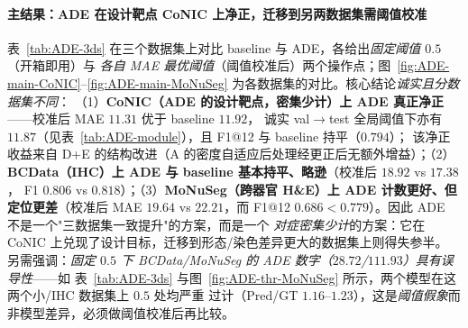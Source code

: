 \paragraph{主结果：ADE 在设计靶点 CoNIC 上净正，迁移到另两数据集需阈值校准}
表~\ref{tab:ADE-3ds} 在三个数据集上对比 baseline 与 ADE，各给出\emph{固定阈值 $0.5$}（开箱即用）与
\emph{各自 MAE 最优阈值}（阈值校准后）两个操作点；图~\ref{fig:ADE-main-CoNIC}--\ref{fig:ADE-main-MoNuSeg}
为各数据集的对比。核心结论\emph{诚实且分数据集不同}：
（1）\textbf{CoNIC（ADE 的设计靶点，密集少计）上 ADE 真正净正}——校准后 MAE $11.31$ 优于 baseline $11.92$，
诚实 val$\to$test 全局阈值下亦有 \textbf{$11.87$}（见表~\ref{tab:ADE-module}），且 F1@12 与 baseline 持平（$0.794$）；
该净正收益来自 D+E 的结构改进（A 的密度自适应后处理经更正后无额外增益）；（2）\textbf{BCData（IHC）上 ADE 与 baseline 基本持平、略逊}（校准后 $18.92$ vs $17.38$，
F1 $0.806$ vs $0.818$）；（3）\textbf{MoNuSeg（跨器官 H\&E）上 ADE 计数更好、但定位更差}（校准后 MAE
$19.64$ vs $22.21$，而 F1@12 $0.686 < 0.779$）。因此 ADE 不是一个"三数据集一致提升"的方案，而是一个
\emph{对症密集少计}的方案：它在 CoNIC 上兑现了设计目标，迁移到形态/染色差异更大的数据集上则得失参半。
另需强调：\emph{固定 $0.5$ 下 BCData/MoNuSeg 的 ADE 数字（$28.72$/$111.93$）具有误导性}——如
表~\ref{tab:ADE-3ds} 与图~\ref{fig:ADE-thr-MoNuSeg} 所示，两个模型在这两个小/IHC 数据集上 $0.5$ 处均严重
过计（Pred/GT $1.16$--$1.23$），这是\emph{阈值假象}而非模型差异，必须做阈值校准后再比较。

